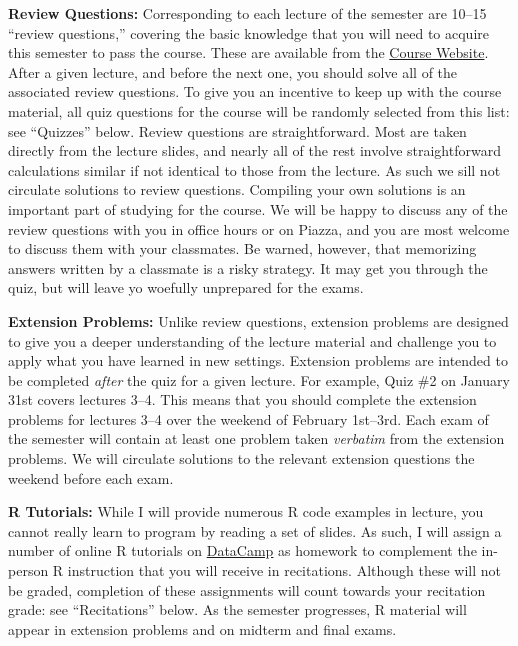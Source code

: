 \documentclass[11pt, letterpaper]{article}
\begin{document}
\medskip
\noindent \textbf{Review Questions:} 
Corresponding to each lecture of the semester are 10--15 ``review questions,'' covering the basic knowledge that you will need to acquire this semester to pass the course.
These are available from the \href{http://ditraglia.com/Econ103Public}{Course Website}.
After a given lecture, and before the next one, you should solve all of the associated review questions. 
To give you an incentive to keep up with the course material, all quiz questions for the course will be randomly selected from this list: see ``Quizzes'' below.
Review questions are straightforward.
Most are taken directly from the lecture slides, and nearly all of the rest involve straightforward calculations similar if not identical to those from the lecture.
As such we sill not circulate solutions to review questions.
Compiling your own solutions is an important part of studying for the course.
We will be happy to discuss any of the review questions with you in office hours or on Piazza, and you are most welcome to discuss them with your classmates.
Be warned, however, that memorizing answers written by a classmate is a risky strategy.
It may get you through the quiz, but will leave yo woefully unprepared for the exams.

\medskip
\noindent \textbf{Extension Problems:} 
Unlike review questions, extension problems are designed to give you a deeper understanding of the lecture material and challenge you to apply what you have learned in new settings.
Extension problems are intended to be completed \emph{after} the quiz for a given lecture. 
For example, Quiz \#2 on January 31st covers lectures 3--4. 
This means that you should complete the extension problems for lectures 3--4 over the weekend of February 1st--3rd.
Each exam of the semester will contain at least one problem taken \emph{verbatim} from the extension problems.
We will circulate solutions to the relevant extension questions the weekend before each exam.

\medskip
\noindent \textbf{R Tutorials:}
While I will provide numerous R code examples in lecture, you cannot really learn to program by reading a set of slides.
As such, I will assign a number of online R tutorials on \href{https://datacamp.com}{DataCamp} as homework to complement the in-person R instruction that you will receive in recitations.
Although these will not be graded, completion of these assignments will count towards your recitation grade: see ``Recitations'' below.
As the semester progresses, R material will appear in extension problems and on midterm and final exams.
\end{document}

